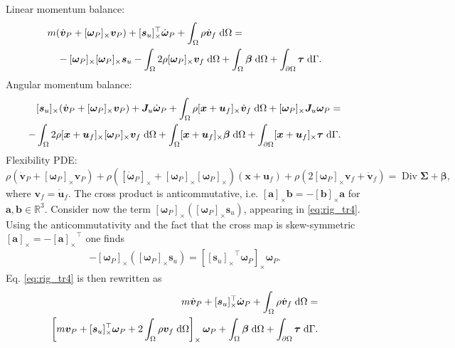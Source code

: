 \documentclass{svjour3}                     %
\DeclareMathOperator*{\Div}{Div}
\newcommand{\crmat}[1]{\ensuremath{[#1]_{\times}}}
\begin{document}
Linear momentum balance:
\begin{equation}
\label{eq:rig_tr4}
\begin{split}
&m (\dot{\bm{v}}_P + \crmat{\bm{\omega}_P} \bm{v}_P) + \crmat{\bm{s}_u}^\top \dot{\bm{\omega}}_P  + \int_{\Omega} \rho \dot{\bm{v}}_f \d{\Omega} = \\
&\quad - \crmat{\bm{\omega}_P} \crmat{\bm{\omega}_P} \bm{s}_u - \int_{\Omega} 2 \rho \crmat{\bm{\omega}_P} {\bm{v}}_f \d{\Omega} +  \int_{\Omega} \bm\beta \d{\Omega} + \int_{\partial \Omega} \bm\tau \d{\Gamma}.
\end{split}
\end{equation}
Angular momentum balance:
\begin{equation}
\label{eq:rig_rot4}
\begin{split}
\crmat{\bm{s}_u} (\dot{\bm{v}}_P + \crmat{\bm{\omega}_P} \bm{v}_P) + \bm{J}_u \dot{\bm\omega}_P + \int_{\Omega} \rho \crmat{\bm{x}+\bm{u}_f} \dot{\bm{v}}_f \d{\Omega} + \crmat{\bm{\omega}_P} \bm{J}_u \bm{\omega}_P = \\ 
- \int_{\Omega} 2\rho \crmat{\bm{x}+\bm{u}_f} \crmat{\bm\omega_P} {\bm{v}}_f \d{\Omega} + \int_{\Omega}\crmat{\bm{x}+\bm{u}_f} \bm\beta \d{\Omega} + \int_{\partial \Omega}\crmat{\bm{x}+\bm{u}_f} \bm\tau \d{\Gamma}. \\
\end{split}
\end{equation}
Flexibility PDE:
\begin{equation}
\label{eq:flex4}
\rho (\dot{\bm{v}}_P + \crmat{\bm\omega_P} \bm{v}_P) + \rho (\crmat{\dot{\bm\omega}_P} + \crmat{\bm{\omega}_P}\crmat{\bm{\omega}_P})(\bm{x}+\bm{u}_f) + \rho (2 \crmat{\bm{\omega}_P} {\bm{v}}_f + \dot{\bm{v}}_f) = \Div{\bm\Sigma} + \bm\beta,
\end{equation}
where $\bm{v}_f = \dot{\bm{u}}_f$. The cross product is anticommutative, i.e. $\crmat{\bm{a}} \bm{b} = - \crmat{\bm{b}} \bm{a}$ for $\bm{a}, \bm{b} \in \mathbb{R}^3$. Consider now the term $\crmat{\bm{\omega}_P} (\crmat{\bm{\omega}_P} \bm{s}_u)$, appearing in \eqref{eq:rig_tr4}. Using the anticommutativity and the fact that the cross map is skew-symmetric $\crmat{\bm{a}} = -\crmat{\bm{a}}^\top$ one finds
\begin{align*}
-\crmat{\bm{\omega}_P} (\crmat{\bm{\omega}_P} \bm{s}_u) = \crmat{\crmat{\bm{s}_u}^\top\bm{\omega}_{P}} \bm{\omega}_{P}.
\end{align*}
Eq. \eqref{eq:rig_tr4} is then rewritten as
\begin{equation}
\label{eq:rig_tr5}
\begin{split}
m\dot{\bm{v}}_P + \crmat{\bm{s}_u}^\top \dot{\bm{\omega}}_P +   \int_{\Omega} \rho \dot{\bm{v}}_f \d{\Omega}  = \\
\left[m \bm{v}_P + \crmat{\bm{s}_u}^\top \bm\omega_P +2 \int_{\Omega} \rho \bm{v}_f \d{\Omega} \right]_\times \bm\omega_P +  \int_{\Omega} \bm\beta \d{\Omega} + \int_{\partial \Omega} \bm\tau \d{\Gamma}.
\end{split}
\end{equation}
\end{document}
